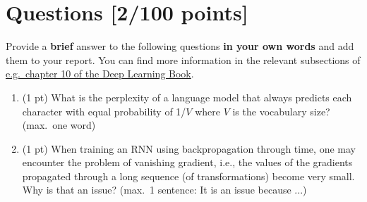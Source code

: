 \documentclass[a4paper,11pt]{article}
\begin{document}
\begin{enumerate}

\end{enumerate}

\section{Questions [2/100 points]}
Provide a \textbf{brief} answer to the following questions \textbf{in your own words} and add them to your report.
You can find more information in the relevant subsections of \href{https://www.deeplearningbook.org/}{e.g.~chapter 10 of the Deep Learning Book}.  
\begin{enumerate}
\item (1 pt) What is the perplexity of a language model that always predicts each character with equal probability of 1/$V$ where $V$ is the vocabulary size? (max.~one word)
\item (1 pt) When training an RNN using backpropagation through time, one may encounter the problem of vanishing gradient, i.e., the values of the gradients propagated through a long sequence (of transformations) become very small. Why is that an issue?
(max.~1 sentence: It is an issue because ...)

\end{enumerate}
\end{document}
